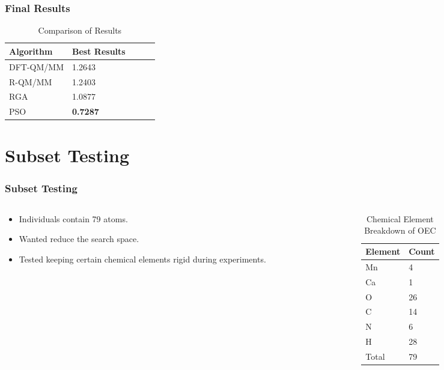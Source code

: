 \documentclass[10pt]{beamer}
\begin{document}
\begin{frame}
	\frametitle{Final Results}

	\begin{table}
		\caption{Comparison of Results}
		\begin{tabular}{ | l | l | l | l | l | }
		  \hline
		    Algorithm & Best Results \\ \hline
		    DFT-QM/MM & 1.2643 \\ \hline
		    R-QM/MM & 1.2403 \\ \hline
		    RGA & 1.0877 \\ \hline
		    PSO & \textbf{0.7287} \\ \hline
		\end{tabular}
	\end{table}

\end{frame}

\section{Subset Testing}

\begin{frame}
	\frametitle{Subset Testing}

	\begin{columns}[T]
		\begin{column}{.5\textwidth}
			\begin{itemize}
				\item Individuals contain 79 atoms.
				\item Wanted reduce the search space.
				\item Tested keeping certain chemical elements rigid during experiments.
			\end{itemize}
		\end{column}
		\begin{column}{.5\textwidth}
			\begin{table}
				\caption{Chemical Element Breakdown of OEC}
				\begin{tabular}{ | l | l | }
				  \hline
				    Element & Count \\ \hline
				    Mn & 4 \\ \hline
				    Ca & 1 \\ \hline
				    O & 26 \\ \hline
				    C & 14 \\ \hline
				    N & 6 \\ \hline
				    H & 28 \\ \hline
				    Total & 79 \\ \hline
				\end{tabular}
			\end{table}
		\end{column}
	\end{columns}

\end{frame}
\end{document}
